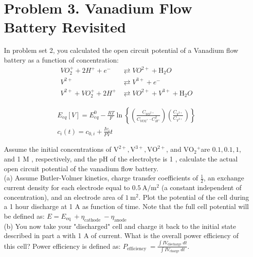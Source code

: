 \documentclass[12pt]{article}
\begin{document}
\section*{Problem 3. Vanadium Flow Battery Revisited}
In problem set 2, you calculated the open circuit potential of a Vanadium flow battery as a function of concentration:\\

$$
\begin{aligned}
V O_{2}^{+}+2 H^{+}+e^{-} & \rightleftarrows V O^{2+}+\mathrm{H}_{2} O \\
V^{2+} & \rightleftarrows V^{3+}+e^{-} \\
\hline V^{2+}+V O_{2}^{+}+2 H^{+} & \rightleftarrows V O^{2+}+V^{3+}+\mathrm{H}_{2} O
\end{aligned}
$$

$$
\begin{gathered}
E_{e q}[V]=E_{e q}^{0}-\frac{R T}{F} \ln \left\{\left(\frac{C_{V O^{2+}}}{C_{V O 2^{+}} \cdot C_{H^{+}}^{2}}\right)\left(\frac{C_{V^{3+}}}{C_{V^{2+}}}\right)\right\} \\
c_{i}(t)=c_{0, i}+\frac{I v_{i}}{F V} t
\end{gathered}
$$

Assume the initial concentrations of $\mathrm{V}^{2+}, \mathrm{V}^{3+}, \mathrm{VO}^{2+}$, and $\mathrm{VO}_{2}{ }^{+}$are $0.1,0.1,1$, and 1 M , respectively, and the pH of the electrolyte is 1 , calculate the actual open circuit potential of the vanadium flow battery.\\
(a) Assume Butler-Volmer kinetics, charge transfer coefficients of $\frac{1}{2}$, an exchange current density for each electrode equal to $0.5 \mathrm{~A} / \mathrm{m}^{2}$ (a constant independent of concentration), and an electrode area of $1 \mathrm{~m}^{2}$. Plot the potential of the cell during a 1 hour discharge at 1 A as function of time. Note that the full cell potential will be defined as: $E=E_{\text {eq }}+\eta_{\text {cathode }}-\eta_{\text {anode }}$\\
(b) You now take your "discharged" cell and charge it back to the initial state described in part a with 1 A of current. What is the overall power efficiency of this cell? Power efficiency is defined as: $P_{\text {efficiency }}=\frac{\int I V_{\text {discharge }} d t}{\int I V_{\text {charge }} d t}$.
\end{document}
